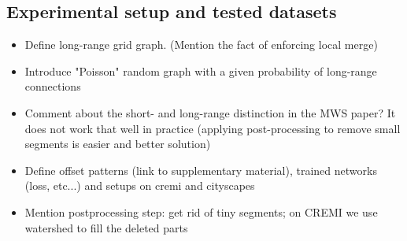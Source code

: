 
\subsection{Experimental setup and tested datasets}
\begin{itemize}
    \item Define long-range grid graph. (Mention the fact of enforcing local merge)
\item Introduce "Poisson" random graph with a given probability of long-range connections
\item Comment about the short- and long-range distinction in the MWS paper? It does not work that well in practice (applying post-processing to remove small segments is easier and better solution)
\item Define offset patterns (link to supplementary material), trained networks (loss, etc...) and setups on cremi and cityscapes 
\item Mention postprocessing step: get rid of tiny segments; on CREMI we use watershed to fill the deleted parts 
\end{itemize}
